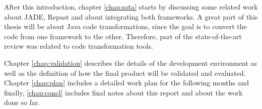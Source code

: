 After this introduction, chapter \ref{chap:sota} starts by discussing some related work about JADE, Repast and about integrating both frameworks. A great part of this thesis will be about Java code transformations, since the goal is to convert the code from one framework to the other. Therefore, part of the state-of-the-art review was related to code transformation tools.

Chapter \ref{chap:validation} describes the details of the development environment as well as the definition of how the final product will be validated and evaluated. Chapter \ref{chap:plan} includes a detailed work plan for the following months and finally, \ref{chap:concl} includes final notes about this report and about the work done so far.